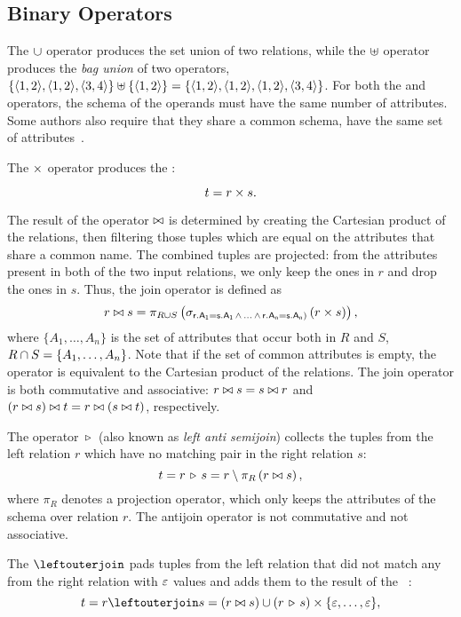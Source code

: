 \subsection{Binary Operators}
\label{sec:binary-operators}

The $\cup$ operator produces the set union of two relations, while the $\uplus$ operator produces the \emph{bag union} of two operators, \eg $\{\langle 1, 2 \rangle, \langle 1, 2 \rangle, \langle 3, 4 \rangle\} \uplus \{\langle 1, 2 \rangle\} = \{\langle 1, 2 \rangle, \langle 1, 2 \rangle, \langle 1, 2 \rangle, \langle 3, 4 \rangle\}$. For both the \uniontext and \baguniontext operators, the schema of the operands must have the same number of attributes. Some authors also require that they share a common schema, \ie have the same set of attributes~\cite{DBLP:books/daglib/0020812}.

The $\times$ operator produces the \cartesianproducttext:

$$ t = r \times s.$$

The result of the \jointext operator $\bowtie$ is determined by creating the Cartesian product of the relations, then filtering those tuples which are equal on the attributes that share a common name. The combined tuples are projected: from the attributes present in both of the two input relations, we only keep the ones in $r$ and drop the ones in $s$. Thus, the join operator is defined as
$$r \bowtie s = \pi_{R \cup S} \left(\sigma_{\mathsf{r.A_1 = s.A_1\,\land\,\ldots\,\land\,r.A_n = s.A_n)}} \left(r \times s\right) \right),$$
where $ \{ A_1, \ldots, A_n \} $ is the set of attributes that occur both in $R$ and $S$, \ie $ R \cap S = \{ A_1, \ldots, A_n \} $. Note that if the set of common attributes is empty, the \jointext operator is equivalent to the Cartesian product of the relations.
The join operator is both commutative and associative: $r \bowtie s = s \bowtie r$ and $(r \bowtie s) \bowtie t = r \bowtie (s \bowtie t)$, respectively.

The \antijointext operator $\, \triangleright \,$ (also known as \emph{left anti semijoin}) collects the tuples from the left relation $r$ which have no matching pair in the right relation $s$:
$$ t = r \, \triangleright \, s = r \setminus \pi_{R} \left(r \bowtie s\right), $$
where $\pi_{R}$ denotes a projection operator, which only keeps the attributes of the schema over relation $r$. The antijoin operator is not commutative and not associative.

The \leftouterjointext $\myleftouterjoin$ pads tuples from the left relation that did not match any from the right relation with $\varepsilon$ values and adds them to the result of the \jointext~\cite{DBLP:books/daglib/0015084}:
$$ t = r \myleftouterjoin s = (r \join s) \union (r \antijoin s) \cartesianproductop \{\relnull, \ldots, \relnull\}, $$

